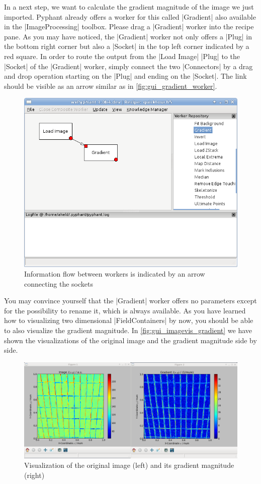 \documentclass[a4paper]{article}
\begin{document}
In a next step, we want to calculate the gradient magnitude of the
image we just imported. Pyphant already offers a worker for this
called |Gradient| also available in the |ImageProcessing|
toolbox. Please drag a |Gradient| worker into the recipe pane. As you
may have noticed, the |Gradient| worker not only offers a |Plug| in
the bottom right corner but also a |Socket| in the top left corner
indicated by a red square. In order to route the output from the |Load Image|
|Plug| to the |Socket| of the |Gradient| worker, simply connect
the two |Connectors| by a drag and drop operation starting on the |Plug|
and ending on the |Socket|. The link should be visible as an
arrow similar as in \autoref{fig:gui_gradient_worker}.
\begin{figure}[h]
  \centering
  \includegraphics[scale=0.75]{fig/gui_gradient_worker.png}
  \caption{Information flow between workers is indicated by an
  arrow connecting the sockets}
  \label{fig:gui_gradient_worker}
\end{figure}
You may convince yourself that the |Gradient| worker offers no
parameters except for the possibility to rename it, which is always
available. As you have learned how to visualizing two dimensional
|FieldContainers| by now, you should be able to also visualize the
gradient magnitude. In \autoref{fig:gui_imagevis_gradient} we have shown
the visualizations of the original image and the gradient magnitude
side by side.
\begin{figure}[h]
  \centering
  \includegraphics[width=\linewidth]{fig/gui_imagevis_gradient.png}
  \caption{Visualization of the original image (left) and its gradient
    magnitude (right)}
  \label{fig:gui_imagevis_gradient}
\end{figure}
\end{document}
